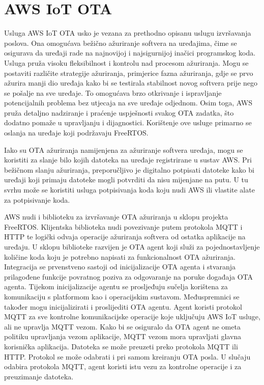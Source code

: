 \section{AWS IoT OTA}

Usluga AWS IoT OTA  usko je vezana za prethodno opisanu uslugu izvršavanja poslova. Ona omogućava bežično ažuriranje softvera na uređajima, čime se osigurava da uređaji rade na najnovijoj i najsigurnijoj inačici programskog koda. Usluga pruža visoku fleksibilnost i kontrolu nad procesom ažuriranja. Mogu se postaviti različite strategije ažuriranja, primjerice fazna ažuriranja, gdje se prvo ažurira manji dio uređaja kako bi se testirala stabilnost novog softvera prije nego se pošalje na sve uređaje. To omogućava brzo otkrivanje i ispravljanje potencijalnih problema bez utjecaja na sve uređaje odjednom. Osim toga, AWS pruža detaljno nadziranje i praćenje uspješnosti svakog OTA zadatka, što dodatno pomaže u upravljanju i dijagnostici. Korištenje ove usluge primarno se oslanja na uređaje koji podržavaju FreeRTOS. 

Iako su OTA ažuriranja namijenjena za ažuriranje softvera uređaja, mogu se koristiti za slanje bilo kojih datoteka na uređaje registrirane u sustav AWS. Pri bežičnom slanju ažuriranja, preporučljivo je digitalno potpisati datoteke kako bi uređaji koji primaju datoteke mogli potvrditi da nisu mijenjane na putu. U tu svrhu može se koristiti usluga potpisivanja koda koju nudi AWS ili vlastite alate za potpisivanje koda. 

AWS nudi i biblioteku za izvršavanje OTA ažuriranja u sklopu projekta FreeRTOS. Klijentska biblioteka nudi povezivanje putem protokola MQTT i HTTP te logički odvaja operacije ažuriranja softvera od ostatka aplikacije na uređaju. U sklopu biblioteke razvijen je OTA agent koji služi za pojednostavljenje količine koda koju je potrebno napisati za funkcionalnost OTA ažuriranja. Integracija se prvenstveno sastoji od inicijalizacije OTA agenta i stvaranja prilagođene funkcije povratnog poziva za odgovaranje na poruke događaja OTA agenta. Tijekom inicijalizacije agentu se prosljeđuju sučelja korištena za komunikaciju s platformom kao i operacijskim sustavom. Međuspremnici  se također mogu inicijalizirati i proslijediti OTA agentu. Agent koristi protokol MQTT za sve kontrolne komunikacijske operacije koje uključuju AWS IoT usluge, ali ne upravlja MQTT vezom. Kako bi se osiguralo da OTA agent ne ometa politiku upravljanja vezom aplikacije, MQTT vezom mora upravljati glavna korisnička aplikacija. Datoteka se može preuzeti preko protokola MQTT ili HTTP. Protokol se može odabrati i pri samom kreiranju OTA posla. U slučaju odabira protokola MQTT, agent koristi istu vezu za kontrolne operacije i za preuzimanje datoteka.


